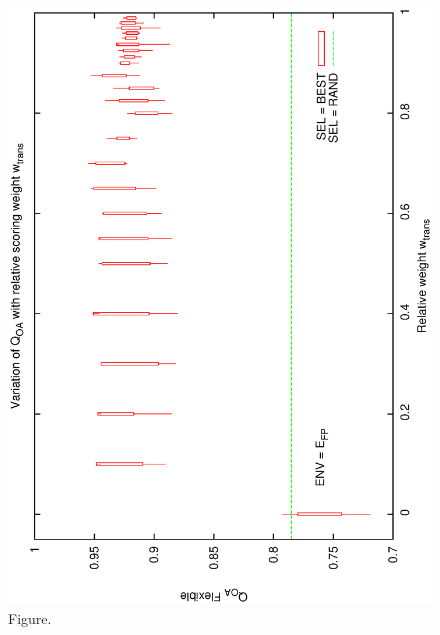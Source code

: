 \documentclass[12pt,a4paper]{article}
\begin{document}
\begin{figure}[htbp]
 \begin{center}
  \includegraphics[scale=1.0, angle=0]{figures/cs1_dw1_foa.eps}
 \end{center}
  \caption[Figure.]
{Figure.}
\end{figure}
\clearpage
\end{document}
